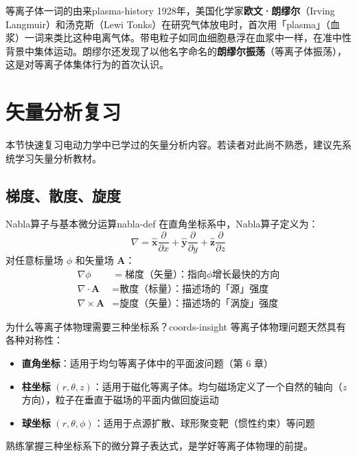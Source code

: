 \documentclass[12pt,a4paper,openany,oneside]{book}
\newcommand{\diffmarktext}[1]{%
  \textcolor{coverMid!80}{\rule[-0.1em]{2pt}{0.9em}}\,%
  \textcolor{coverMid}{\footnotesize\textbf{[#1]}}%
}
\newcommand{\difficulty}[1]{\marginnote{\raggedright\diffmarktext{#1}}}
\newcommand{\vect}[1]{\bm{#1}}
\newcommand{\unitvec}[1]{\hat{\vect{#1}}}
\newcommand{\grad}{\nabla}
\newcommand{\curl}{\nabla\times}
\newcommand{\divg}{\nabla\cdot}
\begin{document}
\begin{history}{等离子体一词的由来}{plasma-history}
1928年，美国化学家\textbf{欧文·朗缪尔}（Irving Langmuir）和汤克斯（Lewi Tonks）在研究气体放电时，首次用「plasma」（血浆）一词来类比这种电离气体。带电粒子如同血细胞悬浮在血浆中一样，在准中性背景中集体运动。朗缪尔还发现了以他名字命名的\textbf{朗缪尔振荡}（等离子体振荡），这是对等离子体集体行为的首次认识。
\end{history}

\section{矢量分析复习}\difficulty{基础}

本节快速复习电动力学中已学过的矢量分析内容。若读者对此尚不熟悉，建议先系统学习矢量分析教材。

\subsection{梯度、散度、旋度}

\begin{definition}{Nabla算子与基本微分运算}{nabla-def}
在直角坐标系中，Nabla算子定义为：
\[
\grad = \unitvec{x}\frac{\partial}{\partial x} + \unitvec{y}\frac{\partial}{\partial y} + \unitvec{z}\frac{\partial}{\partial z}
\]
对任意标量场 $\phi$ 和矢量场 $\vect{A}$：
\begin{align*}
\grad\phi &= \text{梯度（矢量）：指向}\phi\text{增长最快的方向} \\
\divg\vect{A} &= \text{散度（标量）：描述场的「源」强度} \\
\curl\vect{A} &= \text{旋度（矢量）：描述场的「涡旋」强度}
\end{align*}
\end{definition}

\begin{insight}{为什么等离子体物理需要三种坐标系？}{coords-insight}
等离子体物理问题天然具有各种对称性：
\begin{itemize}
\item \textbf{直角坐标}：适用于均匀等离子体中的平面波问题（第 6 章）
\item \textbf{柱坐标} $(r,\theta,z)$：适用于磁化等离子体。均匀磁场定义了一个自然的轴向（$z$方向），粒子在垂直于磁场的平面内做回旋运动
\item \textbf{球坐标} $(r,\theta,\phi)$：适用于点源扩散、球形聚变靶（惯性约束）等问题
\end{itemize}
熟练掌握三种坐标系下的微分算子表达式，是学好等离子体物理的前提。
\end{insight}
\end{document}
